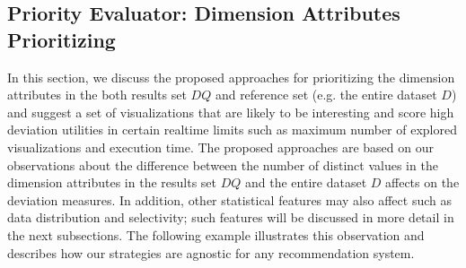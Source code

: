 \subsection{Priority Evaluator: Dimension Attributes Prioritizing}
\label{sec:priority_evaluator}
%
In this section, we discuss the proposed approaches for
prioritizing the dimension attributes in the both results set $DQ$ and reference 
set (e.g. the entire dataset $D$) and suggest a set of visualizations that are likely 
to be interesting and score high deviation utilities in certain realtime limits 
such as maximum number of explored visualizations and execution time.
The proposed approaches are based on our observations about 
the difference between the number of distinct values in the dimension attributes in 
the results set $DQ$ and the entire dataset $D$ affects on the deviation measures. 
In addition, other statistical features may also affect such as data distribution 
and selectivity; such features will be discussed in more detail in the next subsections.
 The following example illustrates this observation and 
describes how our strategies are agnostic for any recommendation system. 
%

